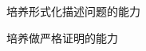 \begin{frame}{}
  \begin{center}

    \vspace{1.00cm}
    {\large 培养形式化描述问题的能力}

    \vspace{0.60cm}
    {\large 培养做严格证明的能力}
  \end{center}
\end{frame}

\begin{frame}{}
\end{frame}
